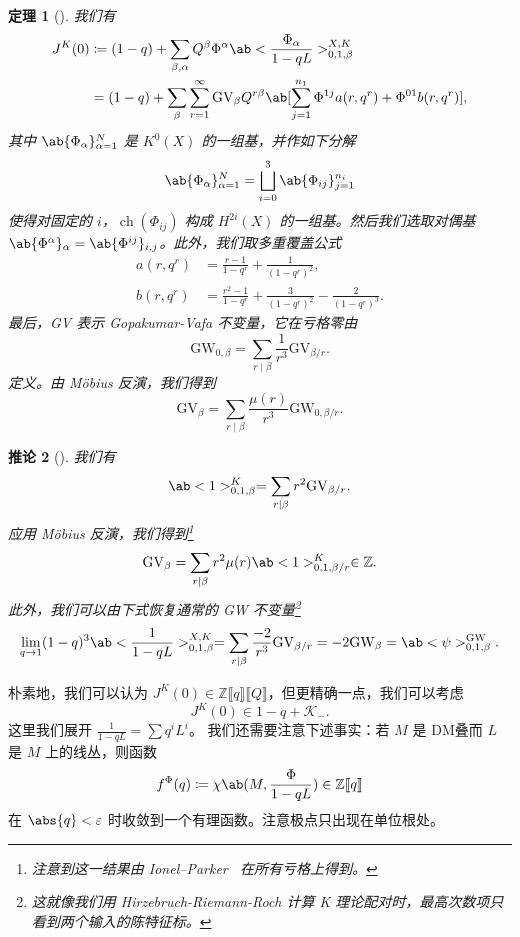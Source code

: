 \documentclass{amsart}
\newtheorem{thm}{定理}[section]
\newtheorem{cor}[thm]{推论}
\theoremstyle{definition}
\theoremstyle{remark}
\theoremstyle{plain}
\theoremstyle{definition}
\theoremstyle{remark}
\newcommand{\Z}{\mathbb{Z}}
\newcommand{\ep}{\varepsilon}
\newcommand{\mc}[1]{\mathcal{#1}}
\newcommand{\mr}[1]{\mathrm{#1}}
\newcommand{\1}{\mathbf{1}}
\newcommand{\2}{\mathbf{2}}
\newcommand{\3}{\mathbf{3}}
\newcommand{\ps}[1]{\llbracket #1 \rrbracket}
\DeclareMathOperator{\ch}{ch}
\begin{document}
\begin{thm}[{\cite{ChouLee2025}}]
    我们有
    \begin{align*}
        J^K(0) &\coloneqq (1-q) + \sum_{\beta, \alpha} Q^{\beta} \Phi^{\alpha} \ab<\frac{\Phi_{\alpha}}{1-qL}>_{0,1,\beta}^{X,K} \\
        &= (1-q) + \sum_{\beta} \sum_{r=1}^{\infty} \mr{GV}_{\beta} Q^{r\beta} \ab[\sum_{j=1}^{n_1} \Phi^{1j} a(r, q^r) + \Phi^{01} b(r, q^r)],
    \end{align*}
    其中 \(\ab\{\Phi_{\alpha}\}_{\alpha=1}^N\) 是 \(K^0(X)\) 的一组基，并作如下分解
    \[ \ab\{\Phi_{\alpha}\}_{\alpha=1}^N = \bigsqcup_{i=0}^3 \ab\{\Phi_{ij}\}_{j=1}^{n_i} \]
    使得对固定的 \(i\)，\(\ch(\Phi_{ij})\) 构成 \(H^{2i}(X)\) 的一组基。然后我们选取对偶基 \(\ab\{\Phi^{\alpha}\}_{\alpha} = \ab\{\Phi^{ij}\}_{i,j}\)。此外，我们取多重覆盖公式
    \begin{align*}
        a(r, q^r) &= \frac{r-1}{1-q^r} + \frac{1}{(1-q^r)^2}, \\
        b(r, q^r) &= \frac{r^2-1}{1-q^r} + \frac{3}{(1-q^r)^2} - \frac{2}{(1-q^r)^3}.
    \end{align*}
    最后，GV 表示 Gopakumar-Vafa 不变量，它在亏格零由
    \[ \mr{GW}_{0,\beta} = \sum_{r \mid \beta} \frac{1}{r^3} \mr{GV}_{\beta/r}. \]
    定义。由 M\"obius 反演，我们得到
    \[ \mr{GV}_{\beta} = \sum_{r \mid \beta} \frac{\mu(r)}{r^3} \mr{GW}_{0,\beta/r}. \]
\end{thm}

\begin{cor}[{\cite{ChouLee2025}}]
    我们有
    \[ \ab<1>_{0,1,\beta}^K = \sum_{r \mid \beta} r^2 \mr{GV}_{\beta/r}. \]
    应用 M\"obius 反演，我们得到\footnote{注意到这一结果由 Ionel--Parker~\cite{IonelParker2018} 在所有亏格上得到。}
    \[ \mr{GV}_{\beta} = \sum_{r \mid \beta} r^2 \mu(r) \ab<1>_{0,1,\beta/r}^K \in \Z. \]
    此外，我们可以由下式恢复通常的 GW 不变量\footnote{这就像我们用 Hirzebruch-Riemann-Roch 计算 K 理论配对时，最高次数项只看到两个输入的陈特征标。}
    \[ \lim_{q \to 1} (1-q)^3 \ab<\frac{1}{1-qL}>_{0,1,\beta}^{X,K} = \sum_{r \mid \beta} \frac{-2}{r^3} \mr{GV}_{\beta/r} = -2 \mr{GW}_{\beta} = \ab<\psi>_{0,1,\beta}^{\mr{GW}}. \]
\end{cor}

朴素地，我们可以认为 \(J^K(0) \in \Z\ps{q}\ps{Q}\)，但更精确一点，我们可以考虑
\[ J^K(0) \in 1-q + \mc{K}_-. \]
这里我们展开 \(\frac{1}{1-qL} = \sum q^i L^i\)。
我们还需要注意下述事实：若 \(M\) 是 DM叠而 \(L\) 是 \(M\) 上的线丛，则函数
\[ f^{\Phi}(q) \coloneqq \chi\ab(M, \frac{\Phi}{1-qL}) \in \Z \ps{q} \]
在 \(\abs{q} < \ep\) 时收敛到一个有理函数。注意极点只出现在单位根处。
\end{document}
